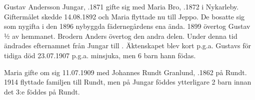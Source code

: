 Gustav Andersson Jungar, .1871 gifte sig med Maria Bro, .1872 i Nykarleby. Giftermålet skedde 14.08.1892 och Maria flyttade nu till Jeppo. De bosatte sig som nygifta i den 1896 nybyggda fädernegårdens ena ända. 1899 övertog Gustav ½ av hemmanet. Brodern Anders övertog den andra delen. Under denna tid ändrades efternamnet från Jungar till . Äktenskapet blev kort p.g.a. Gustavs för tidiga död 23.07.1907 p.g.a. minsjuka, men 6 barn hann födas.
\begin{jhchildren}
  \item {}
  \item {}
  \item {}
  \item {}
  \item {}
  \item {}
\end{jhchildren}
Maria gifte om sig 11.07.1909 med Johannes Rundt Granlund, .1862 på Rundt. 1914 flyttade familjen till Rundt, men på Jungar föddes ytterligare 2 barn innan det 3:e föddes på Rundt.
\begin{jhchildren}
  \item {}
  \item {}
  \item {}
\end{jhchildren}


